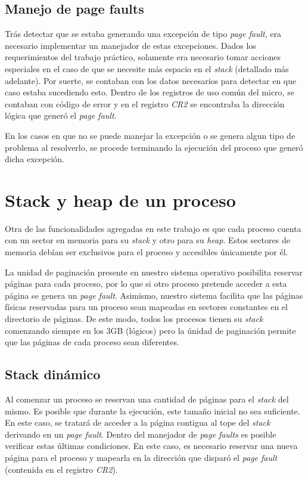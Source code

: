 \documentclass[a4paper,10pt]{article}
\begin{document}
\subsection{Manejo de page faults}

Trás detectar que se estaba generando una excepción de tipo \textit{page fault}, era necesario implementar un manejador de estas 
excepciones. Dados los requerimientos del trabajo práctico, solamente era necesario tomar acciones especiales en el caso de que 
se necesite más espacio en el \textit{stack} (detallado más adelante). Por suerte, se contaban con los datos necesarios para detectar en que 
caso estaba sucediendo esto. Dentro de los registros de uso común del micro, se contaban con código de error y en el registro \textit{CR2} 
se encontraba la dirección lógica que generó el \textit{page fault}.

En los casos en que no se puede manejar la excepción o se genera algun tipo de problema al resolverlo, se procede terminando la 
ejecución del proceso que generó dicha excepción.

\newpage

\section{Stack y heap de un proceso}

Otra de las funcionalidades agregadas en este trabajo es que cada proceso cuenta con un sector en memoria para su \textit{stack} y 
otro para su \textit{heap}. Estos sectores de memoria debían ser exclusivos para el proceso y accesibles únicamente por él.

La unidad de paginación presente en nuestro sistema operativo posibilita reservar páginas para cada proceso, por lo que si otro 
proceso pretende acceder a esta página se genera un \textit{page fault}. Asimismo, nuestro sistema facilita que las 
páginas físicas reservadas para un proceso sean mapeadas en sectores constantes en el directorio de páginas. De este modo, 
todos los procesos tienen su \textit{stack} comenzando siempre en los 3GB (lógicos) pero la únidad de paginación permite que las 
páginas de cada proceso sean diferentes.

\subsection{Stack dinámico}

Al comenzar un proceso se reservan una cantidad de páginas para el \textit{stack} del mismo. Es posible que durante la ejecución, 
este tamaño inicial no sea suficiente. En este caso, se tratará de acceder a la página contigua al tope del \textit{stack} derivando 
en un \textit{page fault}. Dentro del manejador de \textit{page faults} es posible verificar estas últimas condiciones. En este caso, 
es necesario reservar una nueva página para el proceso y mapearla en la dirección que disparó el \textit{page fault} (contenida en 
el registro \textit{CR2}). 
\end{document}
